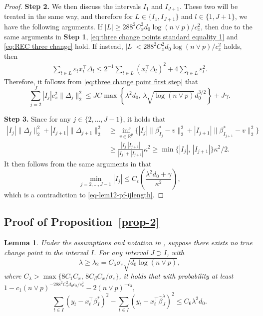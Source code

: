\documentclass[twoside]{article}
\newtheorem{lemma}[theorem]{Lemma}
\begin{document}
\begin{proof}
\vskip 3mm
\noindent \textbf{Step 2.}  We then discuss the intervals $I_1$ and $I_{J+1}$.  These two will be treated in the same way, and therefore for $L \in \{I_1, I_{J+1}\}$ and $l \in \{1, J+1\}$, we have the following arguments.  If $|L| \geq 288^2 C^2_x d_0 \log(n \vee p)/c_x^2$, then due to the same arguments in \textbf{Step 1}, \eqref{eq:three change points standard equality 1} and \eqref{eq:REC three change} hold.  If instead, $|L| < 288^2 C^2_x d_0 \log(n \vee p)/c_x^2$ holds, then
	\begin{align*}  
		\sum_{t\in L} \varepsilon_t x_t^{\top} \Delta_l \leq 2^{-1}\sum_{t \in L}(x_t^{\top}\Delta_l)^2 + 4\sum_{t \in L}\varepsilon_t^2.
	\end{align*}
	Therefore, it follows from \eqref{eq:three change point first step} that
	\[
		\sum_{j = 2}^J |I_j|c_x^2 \|\Delta_j\|_2^2  \leq JC\max\left\{\lambda^2 d_0, \, \lambda \sqrt{\log(n \vee p)} d_0^{3/2}\right\} + J\gamma.
	\]

\vskip 3mm
\noindent \textbf{Step 3.} Since for any $j \in \{2, \ldots, J-1\}$, it holds that
	\begin{align*} 
		|I_j|\|\Delta_j\|_2^2 + |I_{j+1}|\|\Delta_{j+1}\|_2^2 & \geq   \inf_{v \in \mathbb{R}^p}\bigl\{|I_j|\|\beta_{I_j}^* - v\|_2^2 + |I_{j+1}| \|\beta_{I_{j+1}}^* -v\|_2^2\bigr\} \\
		& \geq \frac{|I_j||I_{j+1}|}{|I_j|+|I_{j+1}|} \kappa^2 \geq \min\{|I_j|,\, |I_{j+1}|\}\kappa^2/2.
	\end{align*}
	It then follows from the same arguments in  that
	\[
		\min_{j = 2, \ldots, J-1} |I_j| \leq C_{\epsilon} \left(\frac{\lambda^2 d_0 + \gamma}{\kappa^2}\right),
	\]
	which is a contradiction to \eqref{eq-lem12-pf-ijlength}.
\end{proof}


\subsection{Proof of Proposition~\ref{prop-2}}

\begin{lemma} \label{lem-case-5-prop-2-needed}
Under the assumptions and notation in , suppose there exists no true change point in the interval $I$.  For any interval $J \supset I$, with 
	\[
		\lambda \geq \lambda_2 = C_{\lambda}\sigma_{\varepsilon} \sqrt{d_0 \log(n \vee p)}, 
	\]
	where $C_{\lambda} > \max\{8C_1C_x, \, 8C_{\beta}C_x/\sigma_{\varepsilon}\}$, it holds that with probability at least $1 - c_1 (n \vee p)^{-288^2C_x^2d_0c_2/c_x^2} - 2(n \vee p)^{-c_3}$,
	\[
		\sum_{t \in I} (y_t - x_t^{\top} \beta^*_I)^2 - \sum_{t \in I} (y_t - x_t^{\top} \widehat{\beta}^{\lambda}_J)^2 \leq C_6\lambda^2 d_0.
	\]
\end{lemma}
 
\end{document}
